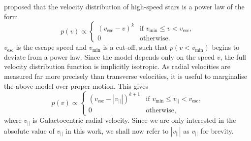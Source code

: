 \documentclass[useAMS,twocolumn,usenatbib]{mn2e}
\def\vlos{{v_{||}}}
\def\vesc{{v_\mathrm{esc}}}
\def\vmin{{v_\mathrm{min}}}
\begin{document}
\cite{Le90} proposed that the velocity distribution of high-speed stars is a power law of the form
%
\begin{equation}
  p(v)\propto\begin{cases}
    (\vesc - v)^k & \text{if $\vmin \leq v<\vesc$},\\
    0 & \text{otherwise}.
  \end{cases}
  \label{eq:lt90}
\end{equation}
%
$\vesc$ is the escape speed and $\vmin$ is a cut-off, such that $p(v < \vmin)$ begins to deviate from a power law. 
Since the model depends only on the speed $v$, the full velocity distribution function is implicitly isotropic. 
As radial velocities are measured far more precisely than transverse velocities, it is useful to marginalise the above model over proper motion. 
This gives
%
\begin{equation}
  p(v)\propto\begin{cases}
    (\vesc - |\vlos|)^{k+1} & \text{if $\vmin \leq \vlos <\vesc$},\\
    0 & \text{otherwise},
  \end{cases}
\end{equation}
%
where $\vlos$ is Galactocentric radial velocity. 
Since we are only interested in the absolute value of $\vlos$ in this work, we shall now refer to $|\vlos|$ as $\vlos$ for brevity.
\end{document}

